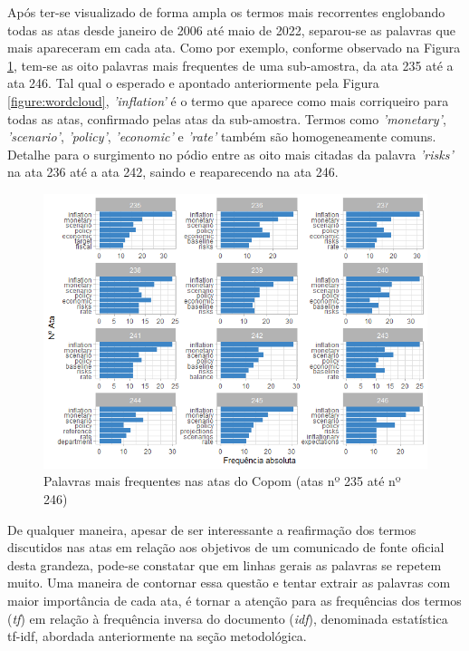 Após ter-se visualizado de forma ampla os termos mais recorrentes englobando todas as atas desde janeiro de 2006 até maio de 2022, separou-se as palavras que mais apareceram em cada ata. Como por exemplo, conforme observado na Figura \ref{figure:absolut_freq_words}, tem-se as oito palavras mais frequentes de uma sub-amostra, da ata 235 até a ata 246. Tal qual o esperado e apontado anteriormente pela Figura \ref{figure:wordcloud}, \textit{'inflation'} é o termo que aparece como mais corriqueiro para todas as atas, confirmado pelas atas da sub-amostra. Termos como \textit{'monetary'}, \textit{'scenario'}, \textit{'policy'}, \textit{'economic'} e \textit{'rate'} também são homogeneamente comuns. Detalhe para o surgimento no pódio entre as oito mais citadas da palavra \textit{'risks'} na ata 236 até a ata 242, saindo e reaparecendo na ata 246.

\begin{figure}
	\centering
	\caption{Palavras mais frequentes nas atas do Copom (atas nº 235 até nº 246)} \label{figure:absolut_freq_words}
	\includegraphics[scale = 0.75]{figuras/words_frequency_copom_text.png}
\end{figure}

De qualquer maneira, apesar de ser interessante a reafirmação dos termos discutidos nas atas em relação aos objetivos de um comunicado de fonte oficial desta grandeza, pode-se constatar que em linhas gerais as palavras se repetem muito. Uma maneira de contornar essa questão e tentar extrair as palavras com maior importância de cada ata, é tornar a atenção para as frequências dos termos (\textit{tf}) em relação à frequência inversa do documento (\textit{idf}), denominada estatística tf-idf, abordada anteriormente na seção metodológica.

